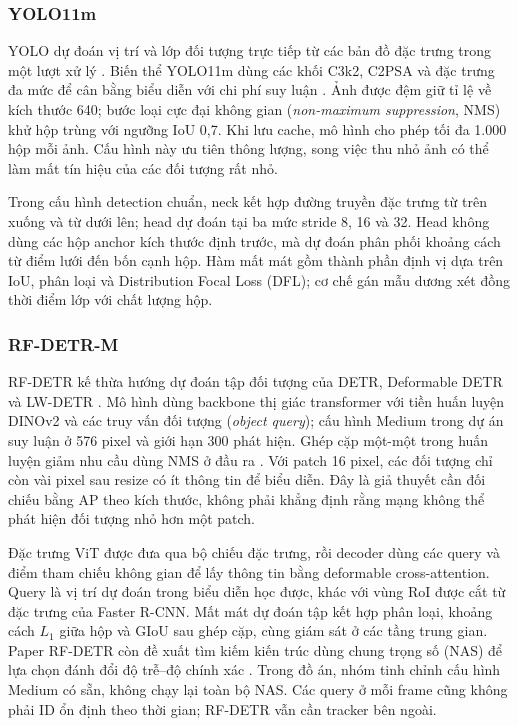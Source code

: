 \documentclass[fontsize=13pt,a4paper,oneside,parskip=false,numbers=noenddot,bibliography=totoc]{scrreprt}
\begin{document}
\subsubsection{YOLO11m}
YOLO dự đoán vị trí và lớp đối tượng trực tiếp từ các bản đồ đặc trưng trong một lượt xử lý \cite{redmon2016yolo}. Biến thể YOLO11m dùng các khối C3k2, C2PSA và đặc trưng đa mức để cân bằng biểu diễn với chi phí suy luận \cite{jocher2024yolo11,khanam2024yolov11}. Ảnh được đệm giữ tỉ lệ về kích thước 640; bước loại cực đại không gian (\textit{non-maximum suppression}, NMS) khử hộp trùng với ngưỡng IoU 0,7. Khi lưu cache, mô hình cho phép tối đa 1.000 hộp mỗi ảnh. Cấu hình này ưu tiên thông lượng, song việc thu nhỏ ảnh có thể làm mất tín hiệu của các đối tượng rất nhỏ.

Trong cấu hình detection chuẩn, neck kết hợp đường truyền đặc trưng từ trên xuống và từ dưới lên; head dự đoán tại ba mức stride 8, 16 và 32. Head không dùng các hộp anchor kích thước định trước, mà dự đoán phân phối khoảng cách từ điểm lưới đến bốn cạnh hộp. Hàm mất mát gồm thành phần định vị dựa trên IoU, phân loại và Distribution Focal Loss (DFL); cơ chế gán mẫu dương xét đồng thời điểm lớp với chất lượng hộp. 

\subsubsection{RF-DETR-M}
RF-DETR kế thừa hướng dự đoán tập đối tượng của DETR, Deformable DETR và LW-DETR \cite{carion2020detr,zhu2021deformable,chen2024lwdetr}. Mô hình dùng backbone thị giác transformer với tiền huấn luyện DINOv2 \cite{oquab2024dinov2} và các truy vấn đối tượng (\textit{object query}); cấu hình Medium trong dự án suy luận ở 576 pixel và giới hạn 300 phát hiện. Ghép cặp một-một trong huấn luyện giảm nhu cầu dùng NMS ở đầu ra \cite{robinson2025rfdetr}. Với patch 16 pixel, các đối tượng chỉ còn vài pixel sau resize có ít thông tin để biểu diễn. Đây là giả thuyết cần đối chiếu bằng AP theo kích thước, không phải khẳng định rằng mạng không thể phát hiện đối tượng nhỏ hơn một patch.

Đặc trưng ViT được đưa qua bộ chiếu đặc trưng, rồi decoder dùng các query và điểm tham chiếu không gian để lấy thông tin bằng deformable cross-attention. Query là vị trí dự đoán trong biểu diễn học được, khác với vùng RoI được cắt từ đặc trưng của Faster R-CNN. Mất mát dự đoán tập kết hợp phân loại, khoảng cách $L_1$ giữa hộp và GIoU sau ghép cặp, cùng giám sát ở các tầng trung gian. Paper RF-DETR còn đề xuất tìm kiếm kiến trúc dùng chung trọng số (NAS) để lựa chọn đánh đổi độ trễ--độ chính xác \cite{robinson2025rfdetr}. Trong đồ án, nhóm tinh chỉnh cấu hình Medium có sẵn, không chạy lại toàn bộ NAS. Các query ở mỗi frame cũng không phải ID ổn định theo thời gian; RF-DETR vẫn cần tracker bên ngoài.
\end{document}
